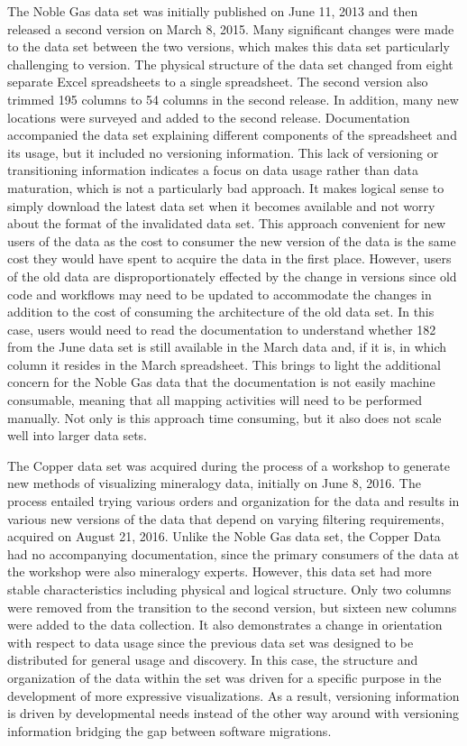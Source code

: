 The Noble Gas data set was initially published on June 11, 2013 and then released a second version on March 8, 2015.
Many significant changes were made to the data set between the two versions, which makes this data set particularly challenging to version.
The physical structure of the data set changed from eight separate Excel spreadsheets to a single spreadsheet.
The second version also trimmed 195 columns to 54 columns in the second release.
In addition, many new locations were surveyed and added to the second release.
Documentation accompanied the data set explaining different components of the spreadsheet and its usage, but it included no versioning information.
This lack of versioning or transitioning information indicates a focus on data usage rather than data maturation, which is not a particularly bad approach.
It makes logical sense to simply download the latest data set when it becomes available and not worry about the format of the invalidated data set.
This approach convenient for new users of the data as the cost to consumer the new version of the data is the same cost they would have spent to acquire the data in the first place.
However, users of the old data are disproportionately effected by the change in versions since old code and workflows may need to be updated to accommodate the changes in addition to the cost of consuming the architecture of the old data set.
In this case, users would need to read the documentation to understand whether 182 from the June data set is still available in the March data and, if it is, in which column it resides in the March spreadsheet.
This brings to light the additional concern for the Noble Gas data that the documentation is not easily machine consumable, meaning that all mapping activities will need to be performed manually.
Not only is this approach time consuming, but it also does not scale well into larger data sets.

The Copper data set was acquired during the process of a workshop to generate new methods of visualizing mineralogy data, initially on June 8, 2016.
The process entailed trying various orders and organization for the data and results in various new versions of the data that depend on varying filtering requirements, acquired on August 21, 2016.
Unlike the Noble Gas data set, the Copper Data had no accompanying documentation, since the primary consumers of the data at the workshop were also mineralogy experts.
However, this data set had more stable characteristics including physical and logical structure.
Only two columns were removed from the transition to the second version, but sixteen new columns were added to the data collection.
It also demonstrates a change in orientation with respect to data usage since the previous data set was designed to be distributed for general usage and discovery.
In this case, the structure and organization of the data within the set was driven for a specific purpose in the development of more expressive visualizations.
As a result, versioning information is driven by developmental needs instead of the other way around with versioning information bridging the gap between software migrations.

